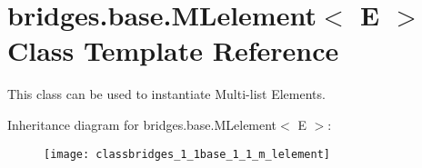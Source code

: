 \hypertarget{classbridges_1_1base_1_1_m_lelement}{}\section{bridges.\+base.\+M\+Lelement$<$ E $>$ Class Template Reference}
\label{classbridges_1_1base_1_1_m_lelement}


This class can be used to instantiate Multi-\/list Elements.  


Inheritance diagram for bridges.\+base.\+M\+Lelement$<$ E $>$\+:\begin{figure}[H]
\begin{center}
\leavevmode
\texttt{[image: classbridges\_1\_1base\_1\_1\_m\_lelement]}
\end{center}
\end{figure}
